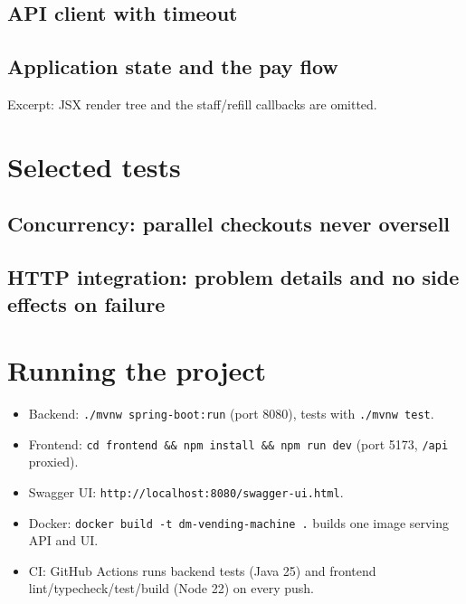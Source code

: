 \documentclass[11pt,a4paper]{article}
\newcommand{\code}[1]{\texttt{\small #1}}
\begin{document}


\subsection{API client with timeout}



\newpage
\subsection{Application state and the pay flow}

Excerpt: JSX render tree and the staff/refill callbacks are omitted.



\section{Selected tests}

\subsection{Concurrency: parallel checkouts never oversell}



\newpage
\subsection{HTTP integration: problem details and no side effects on failure}



\section{Running the project}



\begin{itemize}[itemsep=2pt]
  \item Backend: \code{./mvnw spring-boot:run} (port 8080), tests with \code{./mvnw test}.
  \item Frontend: \code{cd frontend \&\& npm install \&\& npm run dev} (port 5173, \code{/api} proxied).
  \item Swagger UI: \code{http://localhost:8080/swagger-ui.html}.
  \item Docker: \code{docker build -t dm-vending-machine .} builds one image serving API and UI.
  \item CI: GitHub Actions runs backend tests (Java 25) and frontend lint/typecheck/test/build (Node 22) on every push.
\end{itemize}
\end{document}
